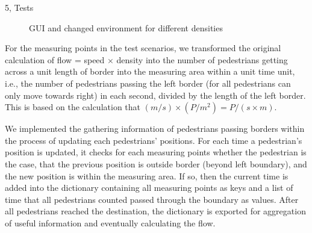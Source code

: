 \documentclass[10pt,a4paper]{article}
\begin{document}
\begin{task}{5, Tests}
\begin{figure} [!h]
 \centering
 \caption{GUI and changed environment for different densities}
 \label{den}
\end{figure}

For the measuring points in the test scenarios, we transformed the original calculation of flow = speed $\times$ density into the number of pedestrians getting across a unit length of border into the measuring area within a unit time unit, i.e., the number of pedestrians passing the left border (for all pedestrians can only move towards right) in each second, divided by the length of the left border. This is based on the calculation that $(m/s) \times (P/m^2) = P/(s\times m)$.

We implemented the gathering information of pedestrians passing borders within the process of updating each pedestrians' positions. For each time a pedestrian's position is updated, it checks for each measuring points whether the pedestrian is the case, that the previous position is outside border (beyond left boundary), and the new position is within the measuring area. If so, then the current time is added into the dictionary containing all measuring points as keys and a list of time that all  pedestrians counted passed through the boundary as values. After all pedestrians reached the destination, the dictionary is exported for aggregation of useful information and eventually calculating the flow. 


\end{task}
\end{document}
